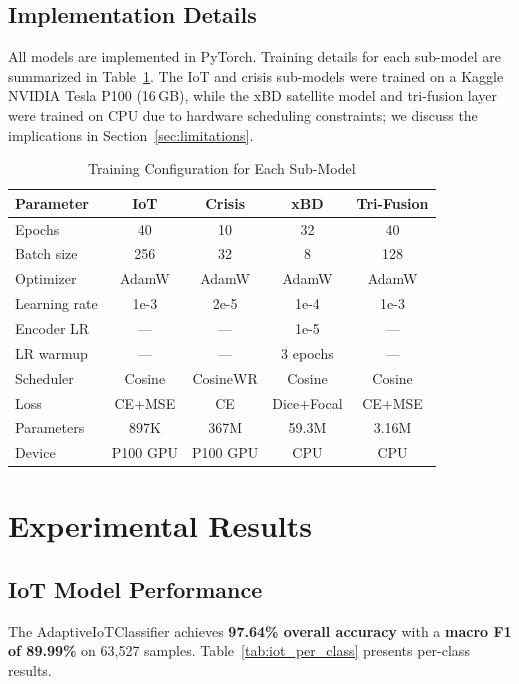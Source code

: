 \documentclass[journal]{IEEEtran}
\begin{document}
\subsection{Implementation Details}

All models are implemented in PyTorch. Training details for each sub-model are summarized in Table~\ref{tab:training_config}. The IoT and crisis sub-models were trained on a Kaggle NVIDIA Tesla P100 (16\,GB), while the xBD satellite model and tri-fusion layer were trained on CPU due to hardware scheduling constraints; we discuss the implications in Section~\ref{sec:limitations}.

\begin{table}[!t]
\centering
\caption{Training Configuration for Each Sub-Model}
\label{tab:training_config}
\begin{tabular}{lcccc}
\toprule
\textbf{Parameter} & \textbf{IoT} & \textbf{Crisis} & \textbf{xBD} & \textbf{Tri-Fusion} \\
\midrule
Epochs & 40 & 10 & 32 & 40 \\
Batch size & 256 & 32 & 8 & 128 \\
Optimizer & AdamW & AdamW & AdamW & AdamW \\
Learning rate & 1e-3 & 2e-5 & 1e-4 & 1e-3 \\
Encoder LR & --- & --- & 1e-5 & --- \\
LR warmup & --- & --- & 3 epochs & --- \\
Scheduler & Cosine & CosineWR & Cosine & Cosine \\
Loss & CE+MSE & CE & Dice+Focal & CE+MSE \\
Parameters & 897K & 367M & 59.3M & 3.16M \\
Device & P100 GPU & P100 GPU & CPU & CPU \\
\bottomrule
\end{tabular}
\end{table}

\section{Experimental Results}

\subsection{IoT Model Performance}

The AdaptiveIoTClassifier achieves \textbf{97.64\% overall accuracy} with a \textbf{macro F1 of 89.99\%} on 63,527 samples. Table~\ref{tab:iot_per_class} presents per-class results.
\end{document}
